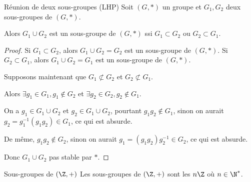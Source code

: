 \begin{proposition}{Réunion de deux sous-groupes (LHP)}{}
    Soit $(G, \ast)$ un groupe et $G_1, G_2$ deux sous-groupes de $(G, \ast)$.

    Alors $G_1 \cup G_2$ est un sous-groupe de $(G, \ast)$ ssi $G_1 \subset G_2$ ou $G_2 \subset G_1$.
\end{proposition}

\begin{proof}
    Si $G_1 \subset G_2$, alors $G_1 \cup G_2 = G_2$ est un sous-groupe de $(G, \ast)$.
    Si $G_2 \subset G_1$, alors $G_1 \cup G_2 = G_1$ est un sous-groupe de $(G, \ast)$.

    \avspace Supposons maintenant que $G_1 \not \subset G_2$ et $G_2 \not \subset G_1$.

    Alors $\exists g_1 \in G_1, g_1 \not \in G_2$ et $\exists g_2 \in G_2, g_2 \not \in G_1$.

    On a $g_1 \in G_1 \cup G_2$ et $g_2 \in G_1 \cup G_2$, pourtant $g_1 g_2 \not \in G_1$, 
    sinon on aurait $g_2 = g_1^{-1} (g_1 g_2) \in G_1$, ce qui est absurde.

    De même, $g_1 g_2 \not \in G_2$, sinon on aurait $g_1 = (g_1 g_2) g_2^{-1} \in G_2$, ce qui est absurde.

    Donc $G_1 \cup G_2$ pas stable par $\ast$. 
\end{proof}

\begin{theoreme}{Sous-groupes de $(\Z, +)$}{}
    Les sous-groupes de $(\Z, +)$ sont les $n\Z$ où $n \in \N^*$.
    
\end{theoreme}


